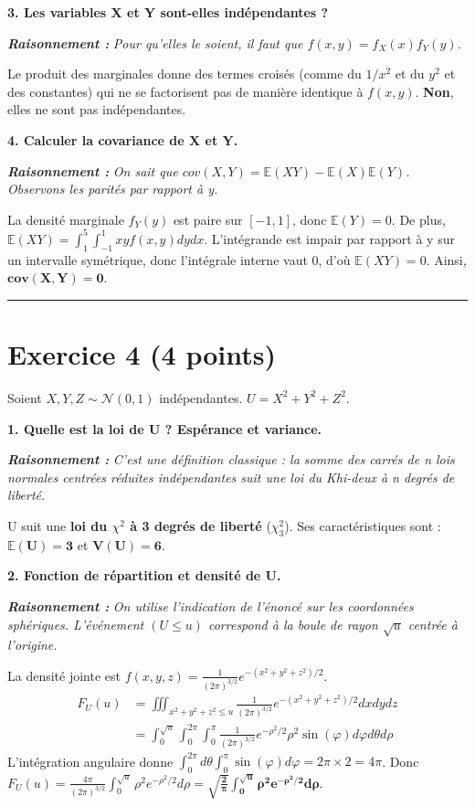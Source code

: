 \documentclass[11pt,a4paper]{article}
\newcommand{\raisonnement}[1]{
    \vspace{0.2cm}
    \noindent\textcolor{blue!80!black}{
        \textbf{\textit{Raisonnement : }} \textit{#1}
    }
    \vspace{0.2cm}
}
\begin{document}
\textbf{3. Les variables X et Y sont-elles indépendantes ?}
\raisonnement{Pour qu'elles le soient, il faut que $f(x,y) = f_X(x)f_Y(y)$.}
Le produit des marginales donne des termes croisés (comme du $1/x^2$ et du $y^2$ et des constantes) qui ne se factorisent pas de manière identique à $f(x,y)$.
\textbf{Non}, elles ne sont pas indépendantes.

\textbf{4. Calculer la covariance de X et Y.}
\raisonnement{On sait que $cov(X,Y) = \mathbb{E}(XY) - \mathbb{E}(X)\mathbb{E}(Y)$. Observons les parités par rapport à y.}
La densité marginale $f_Y(y)$ est paire sur $[-1, 1]$, donc $\mathbb{E}(Y) = 0$.
De plus, $\mathbb{E}(XY) = \int_1^5 \int_{-1}^1 xy f(x,y) dy dx$. L'intégrande est impair par rapport à y sur un intervalle symétrique, donc l'intégrale interne vaut 0, d'où $\mathbb{E}(XY) = 0$.
Ainsi, $\mathbf{cov(X,Y) = 0}$.

\vspace{0.5cm}
\hrule
\vspace{0.5cm}

\section*{Exercice 4 (4 points)}

Soient $X, Y, Z \sim \mathcal{N}(0,1)$ indépendantes. $U = X^2 + Y^2 + Z^2$.

\textbf{1. Quelle est la loi de U ? Espérance et variance.}
\raisonnement{C'est une définition classique : la somme des carrés de n lois normales centrées réduites indépendantes suit une loi du Khi-deux à n degrés de liberté.}
U suit une \textbf{loi du $\chi^2$ à 3 degrés de liberté} ($\chi^2_3$).
Ses caractéristiques sont : $\mathbf{\mathbb{E}(U) = 3}$ et $\mathbf{V(U) = 6}$.

\textbf{2. Fonction de répartition et densité de U.}
\raisonnement{On utilise l'indication de l'énoncé sur les coordonnées sphériques. L'événement $(U \le u)$ correspond à la boule de rayon $\sqrt{u}$ centrée à l'origine.}
La densité jointe est $f(x,y,z) = \frac{1}{(2\pi)^{3/2}} e^{-(x^2+y^2+z^2)/2}$.
\begin{align*}
F_U(u) &= \iiint_{x^2+y^2+z^2 \le u} \frac{1}{(2\pi)^{3/2}} e^{-(x^2+y^2+z^2)/2} dx dy dz \\
&= \int_0^{\sqrt{u}} \int_0^{2\pi} \int_0^\pi \frac{1}{(2\pi)^{3/2}} e^{-\rho^2/2} \rho^2 \sin(\varphi) d\varphi d\theta d\rho
\end{align*}
L'intégration angulaire donne $\int_0^{2\pi} d\theta \int_0^\pi \sin(\varphi) d\varphi = 2\pi \times 2 = 4\pi$.
Donc $F_U(u) = \frac{4\pi}{(2\pi)^{3/2}} \int_0^{\sqrt{u}} \rho^2 e^{-\rho^2/2} d\rho = \mathbf{\sqrt{\frac{2}{\pi}} \int_0^{\sqrt{u}} \rho^2 e^{-\rho^2/2} d\rho}$.
\end{document}
